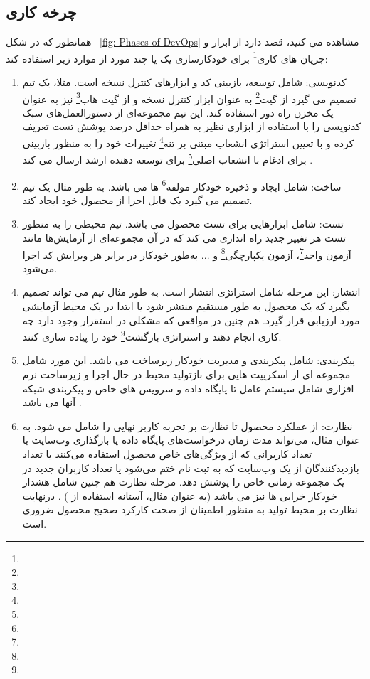 \subsection{چرخه کاری }
همانطور که در شکل 
~\ref{fig: Phases of DevOps}
مشاهده می کنید،
قصد دارد از ابزار و جریان های کاری\footnote{} برای خودکارسازی یک یا چند مورد از موارد زیر استفاده کند: 
\begin{enumerate}
	\item
کدنویسی: شامل توسعه، بازبینی کد و ابزارهای کنترل نسخه است. مثلا، یک تیم تصمیم می گیرد از گیت\footnote{} به عنوان ابزار کنترل نسخه و از گیت هاب\footnote{} نیز به عنوان یک مخزن راه دور استفاده کند. این تیم مجموعه‌ای از دستورالعمل‌های سبک کدنویسی را با استفاده از ابزاری نظیر  به همراه حداقل درصد پوشش تست تعریف کرده و با تعیین استراتژی انشعاب مبتنی بر تنه\footnote{} تغییرات خود را به منظور بازبینی برای ادغام با انشعاب اصلی\footnote{} برای توسعه دهنده ارشد ارسال می کند \cite{Devopstrunk}.
	\item 
ساخت: شامل ایجاد و ذخیره خودکار مولفه\footnote{} ها می باشد. به طور مثال یک تیم تصمیم می گیرد یک  قابل اجرا از محصول خود ایجاد کند.
	\item 
تست: شامل ابزارهایی برای تست محصول می باشد. تیم محیطی را به منظور تست هر تغییر جدید راه اندازی می کند که در آن مجموعه‌ای از آزمایش‌ها مانند آزمون واحد\footnote{}، آزمون یکپارچگی\footnote{} و ... به‌طور خودکار در برابر هر ویرایش کد اجرا می‌شود.
	\item 
انتشار: این مرحله شامل استراتژی انتشار است. به طور مثال تیم می تواند تصمیم بگیرد که یک محصول به طور مستقیم منتشر شود یا ابتدا در یک محیط آزمایشی مورد ارزیابی قرار گیرد. هم چنین در مواقعی که مشکلی در استقرار وجود دارد چه کاری انجام دهند و استراتژی بازگشت\footnote{} خود را پیاده سازی کنند.
	\item 
پیکربندی: شامل پیکربندی و مدیریت خودکار زیرساخت می باشد. این مورد شامل مجموعه ای از اسکریپت هایی برای بازتولید محیط در حال اجرا و زیرساخت نرم افزاری شامل سیستم عامل تا پایگاه داده و سرویس های خاص و پیکربندی شبکه آنها می باشد \cite{DevopsIaac1, DevopsIaac2}.
	\item 
نظارت: از عملکرد محصول تا نظارت بر تجربه کاربر نهایی را شامل می شود. به عنوان مثال، می‌تواند مدت زمان درخواست‌های پایگاه داده یا بارگذاری وب‌سایت یا تعداد کاربرانی که از ویژگی‌های خاص محصول استفاده می‌کنند یا تعداد بازدیدکنندگان از یک وب‌سایت که به ثبت نام ختم می‌شود یا تعداد کاربران جدید در یک مجموعه زمانی خاص را پوشش دهد. مرحله نظارت هم چنین شامل هشدار خودکار خرابی ها نیز می باشد (به عنوان مثال، آستانه استفاده از ) \cite{DevopsMonitor}. درنهایت نظارت بر محیط تولید به منظور اطمینان از صحت کارکرد صحیح محصول ضروری است.

\end{enumerate}
